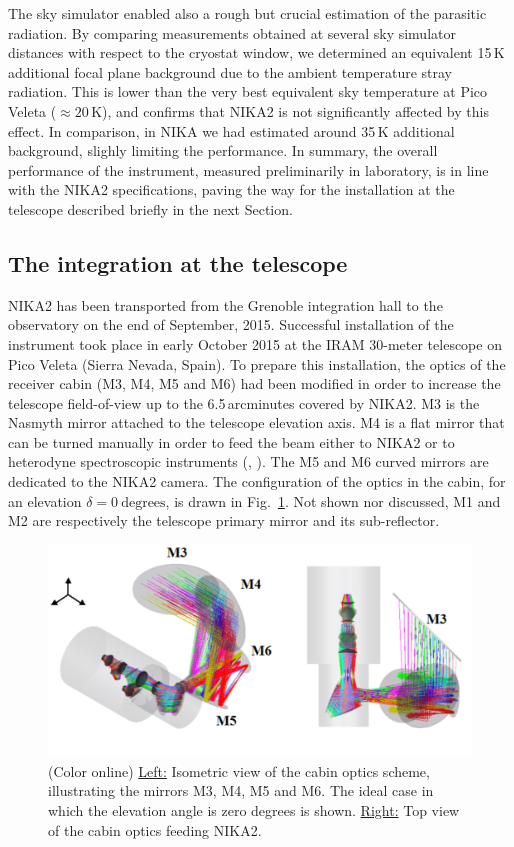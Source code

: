 \documentclass[]{aa} %
\begin{document}
The sky simulator enabled also a rough but crucial estimation of the parasitic radiation. By comparing measurements obtained at several sky simulator distances with respect to the cryostat window, we determined an equivalent 15\,K additional focal plane background due to the ambient temperature stray radiation. This is lower than the very best equivalent sky temperature at Pico Veleta ($\approx 20\,\textrm{K}$), and confirms that NIKA2 is not significantly affected by this effect. In comparison, in NIKA we had estimated around 35\,K additional background, slighly limiting the performance. 
In summary, the overall performance of the instrument, measured preliminarily in laboratory, is in line with the NIKA2 specifications, paving the way for the installation at the telescope described briefly in the next Section. 


\subsection{The integration at the telescope}
\label{The integration at the telescope}

NIKA2 has been transported from the Grenoble integration hall to the observatory on the end of September, 2015. Successful installation of the instrument took place in early October 2015 at the IRAM 30-meter telescope on Pico Veleta (Sierra Nevada, Spain). To prepare this installation, the optics of the receiver cabin (M3, M4, M5 and M6) had been modified in order to increase the telescope field-of-view up to the 6.5\,arcminutes covered by NIKA2. M3 is the Nasmyth mirror attached to the telescope elevation axis. M4 is a flat mirror that can be turned manually in order to feed the beam either to NIKA2 or to heterodyne spectroscopic instruments (\cite{Carter2012}, \cite{Schuster2004}). The M5 and M6 curved mirrors are dedicated to the NIKA2 camera. The configuration of the optics in the cabin, for an elevation $\delta = 0~\textrm{degrees}$, is drawn in Fig.~\ref{figCabin}. Not shown nor discussed, M1 and M2 are respectively the telescope primary mirror and its sub-reflector. 

\begin{figure}[h]
   \centering
    \includegraphics[width=.85\linewidth]{figCabin.png}
      \caption{(Color online) \underline{Left:} Isometric view of the cabin optics scheme, illustrating the mirrors M3, M4, M5 and M6. The ideal case in which the elevation angle is zero degrees is shown. \underline{Right:} Top view of the cabin optics feeding NIKA2.}
         \label{figCabin}
\end{figure}
\end{document}
